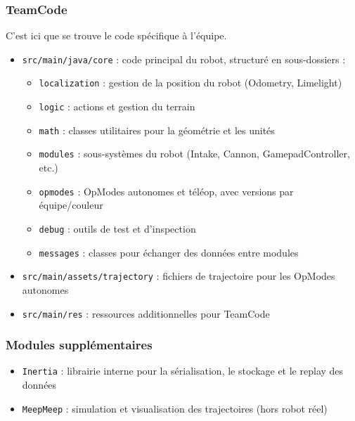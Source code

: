 \documentclass[12pt, a4paper]{report}
\begin{document}
    \subsubsection*{TeamCode}
    C’est ici que se trouve le code spécifique à l’équipe.
    \begin{itemize}
        \item \texttt{src/main/java/core} : code principal du robot, structuré en sous-dossiers :
        \begin{itemize}
            \item \texttt{localization} : gestion de la position du robot (Odometry, Limelight)
            \item \texttt{logic} : actions et gestion du terrain
            \item \texttt{math} : classes utilitaires pour la géométrie et les unités
            \item \texttt{modules} : sous-systèmes du robot (Intake, Cannon, GamepadController, etc.)
            \item \texttt{opmodes} : OpModes autonomes et téléop, avec versions par équipe/couleur
        \end{itemize}

        \begin{itemize}
            \item \texttt{debug} : outils de test et d’inspection
            \item \texttt{messages} : classes pour échanger des données entre modules
        \end{itemize}
        \item \texttt{src/main/assets/trajectory} : fichiers de trajectoire pour les OpModes autonomes
        \item \texttt{src/main/res} : ressources additionnelles pour TeamCode
    \end{itemize}

    \subsubsection*{Modules supplémentaires}
    \begin{itemize}
        \item \texttt{Inertia} : librairie interne pour la sérialisation, le stockage et le replay des données
        \item \texttt{MeepMeep} : simulation et visualisation des trajectoires (hors robot réel)
    \end{itemize}
\end{document}

